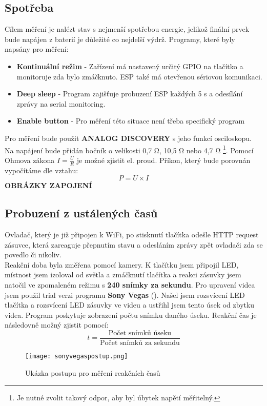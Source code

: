 \documentclass[a4paper, 12pt]{report}
\begin{document}
				\subsection{Spotřeba} \label{metodika:Ustálené stavy spotřeba}
					Cílem měření je nalézt stav s nejmenší spotřebou energie, jelikož finální prvek bude napájen z baterií je důležité co nejdelší výdrž. Programy, které byly napsány pro měření:\\
					\begin{itemize}
						\item {\bf Kontinuální režim} - Zařízení má nastavený určitý GPIO na tlačítko a monitoruje zda bylo zmáčknuto. ESP také má otevřenou sériovou komunikaci.
						\item {\bf Deep sleep} - Program zajišťuje probuzení ESP každých 5 \si{s} a odesílání zprávy na serial monitoring.
						\item {\bf Enable button} - Pro měření této situace není třeba specifický program
					\end{itemize}
					Pro měření bude použit {\bf ANALOG DISCOVERY} s jeho funkcí osciloskopu. Na napájení bude přidán bočník o velikosti 0,7 \si{\ohm}, 10,5 \si{\ohm} nebo 4,7 \si{\ohm} \footnote{Je nutné zvolit takový odpor, aby byl úbytek napětí měřitelný.}. Pomocí Ohmova zákona $ I = \frac{U}{R} $ je možné zjistit el. proud.
					Příkon, který bude porovnán vypočítáme dle vztahu:
					$$P = U \times I$$
					{\bf OBRÁZKY ZAPOJENÍ}
				\subsection{Probuzení z ustálených časů}
					Ovladač, který je již připojen k WiFi, po stisknutí tlačítka odešle HTTP request zásuvce, která zareaguje přepnutím stavu a odesláním zprávy zpět ovladači zda se povedlo či nikoliv.\\
					Reakční doba byla změřena pomocí kamery. K tlačítku jsem připojil LED, místnost jsem izoloval od světla a zmáčknutí tlačítka a reakci zásuvky jsem natočil ve zpomaleném režimu s {\bf 240 snímky za sekundu}. Pro upravení videa jsem použil trial verzi programu {\bf Sony Vegas} (). Našel jsem rozsvícení LED tlačítka a rozsvícení LED zásuvky ve videu a ustřihl jsem tento úsek od zbytku videa. Program poskytuje zobrazení počtu snímku daného úseku. Reakční čas je následovně možný zjistit pomocí:
					$$ t = \frac{\textrm{Počet snímků úseku}}{\textrm{Počet snímků za sekundu}}$$
					\begin{figure}[h]
						\centering
						\texttt{[image: sonyvegaspostup.png]}
						\caption{Ukázka postupu pro měření reakčních časů}
						\label{sonyvegaspostup}
					\end{figure}
\end{document}
